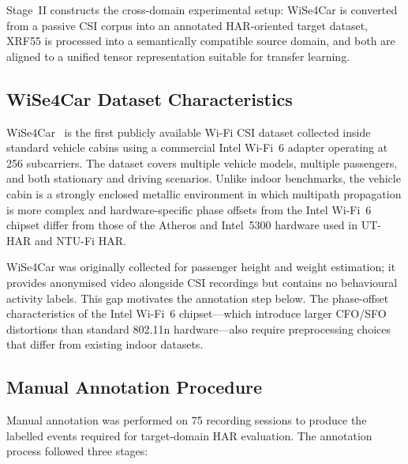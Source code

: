 \documentclass[english,bibtex]{kththesis}
\begin{document}
Stage~II constructs the cross-domain experimental setup: WiSe4Car is converted from a passive CSI corpus into an annotated HAR-oriented target dataset, XRF55 is processed into a semantically compatible source domain, and both are aligned to a unified tensor representation suitable for transfer learning.

\subsection{WiSe4Car Dataset Characteristics}
\label{sec:wise4car}

WiSe4Car~\cite{markert2025wise4car} is the first publicly available Wi-Fi CSI dataset collected inside standard vehicle cabins using a commercial Intel Wi-Fi~6 adapter operating at 256 subcarriers. The dataset covers multiple vehicle models, multiple passengers, and both stationary and driving scenarios. Unlike indoor benchmarks, the vehicle cabin is a strongly enclosed metallic environment in which multipath propagation is more complex and hardware-specific phase offsets from the Intel Wi-Fi~6 chipset differ from those of the Atheros and Intel~5300 hardware used in UT-HAR and NTU-Fi HAR.

WiSe4Car was originally collected for passenger height and weight estimation; it provides anonymised video alongside CSI recordings but contains no behavioural activity labels. This gap motivates the annotation step below. The phase-offset characteristics of the Intel Wi-Fi~6 chipset---which introduce larger CFO/SFO distortions than standard 802.11n hardware---also require preprocessing choices that differ from existing indoor datasets.

\subsection{Manual Annotation Procedure}
\label{sec:annotation}

Manual annotation was performed on 75 recording sessions to produce the labelled events required for target-domain HAR evaluation. The annotation process followed three stages:
\end{document}

